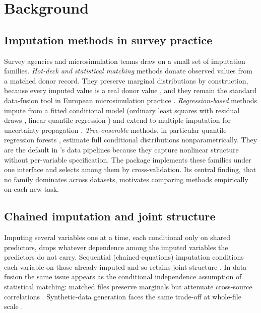 \section{Background}

\subsection{Imputation methods in survey practice}

Survey agencies and microsimulation teams draw on a small set of imputation
families. \emph{Hot-deck and statistical matching} methods donate observed
values from a matched donor record. They preserve marginal distributions by
construction, because every imputed value is a real donor value
\citep{andridge2010review, dorazio2006statistical}, and they remain the
standard data-fusion tool in European microsimulation practice
\citep{sutherland2013euromod}. \emph{Regression-based} methods impute from a
fitted conditional model (ordinary least squares with residual draws
\citep{vonhippel2013should}, linear quantile regression
\citep{koenker1978regression, koenker2005quantile}) and extend to multiple
imputation for uncertainty propagation \citep{rubin1987multiple,
kennickell1998multiple}. \emph{Tree-ensemble} methods, in particular quantile
regression forests \citep{meinshausen2006quantile, breiman2001random},
estimate full conditional distributions nonparametrically. They are the
default in \policyengine{}'s data pipelines \citep{ghenis2018quantile,
woodruff2024enhancing} because they capture nonlinear structure without
per-variable specification. The \microimpute{} package
\citep{policyengine2025microimpute} implements these families under one
interface and selects among them by cross-validation. Its central finding,
that no family dominates across datasets, motivates comparing methods
empirically on each new task.

\subsection{Chained imputation and joint structure}

Imputing several variables one at a time, each conditional only on shared
predictors, drops whatever dependence among the imputed variables the
predictors do not carry. Sequential (chained-equations) imputation
conditions each variable on those already imputed and so retains joint
structure \citep{raghunathan2001multivariate, vanbuuren2011mice}. In data
fusion the same issue appears as the conditional independence assumption of
statistical matching: matched files preserve marginals but attenuate
cross-source correlations \citep{dorazio2006statistical}. Synthetic-data
generation faces the same trade-off at whole-file scale
\citep{rubin1993statistical}.

